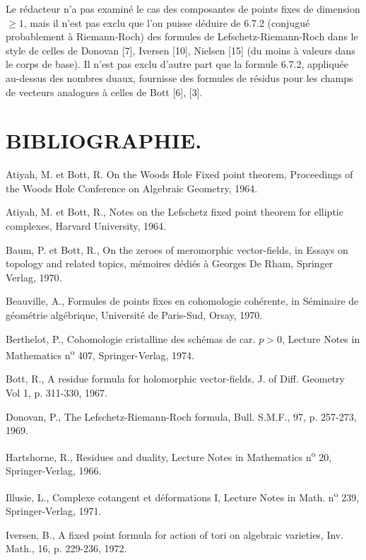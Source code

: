 Le rédacteur n'a pas examiné le cas des composantes de points fixes de dimension $\geq1$, mais il n'est pas exclu que l'on puisse déduire de 6.7.2 (conjugué probablement à Riemann-Roch) des formules de Lefschetz-Riemann-Roch dans le style de celles de Donovan [7], Iversen [10], Nielsen [15] (du moins à valeurs dans le corps de base). Il n'est pas exclu d'autre part que la formule 6.7.2, appliquée au-dessus des nombres duaux, fournisse des formules de résidus pour les champs de vecteurs analogues à celles de Bott [6], [3].


\section*{BIBLIOGRAPHIE.}
\begin{enumerate}[label={[\arabic*]},leftmargin=3.5em]
\item
Atiyah, M. et Bott, R. On the Woods Hole Fixed point theorem, Proceedings of the Woods Hole Conference on Algebraic Geometry, 1964.
\item Atiyah, M. et Bott, R., Notes on the Lefschetz fixed point theorem for elliptic complexes, Harvard University, 1964.
\item Baum, P. et Bott, R., On the zeroes of meromorphic vector-fields, in Essays on topology and related topics, mémoires dédiés à Georges De Rham, Springer Verlag, 1970.
\item Beauville, A., Formules de points fixes en cohomologie cohérente, in Séminaire de géométrie algébrique, Université de Paris-Sud, Orsay, 1970.
\item Berthelot, P., Cohomologie cristalline des schémas de car. $p>0$, Lecture Notes in Mathematics n\textsuperscript{o} 407, Springer-Verlag, 1974.
\item Bott, R., A residue formula for holomorphic vector-fields, J. of Diff. Geometry Vol 1, p. 311-330, 1967.
\item Donovan, P., The Lefschetz-Riemann-Roch formula, Bull. S.M.F., 97, p. 257-273, 1969.
\item Hartshorne, R., Residues and duality, Lecture Notes in Mathematics n\textsuperscript{o} 20, Springer-Verlag, 1966.
\item Illusie, L., Complexe cotangent et déformations I, Lecture Notes in Math. n\textsuperscript{o} 239, Springer-Verlag, 1971.
\item Iversen, B., A fixed point formula for action of tori on algebraic varieties, Inv. Math., 16, p. 229-236, 1972.

\end{enumerate}
